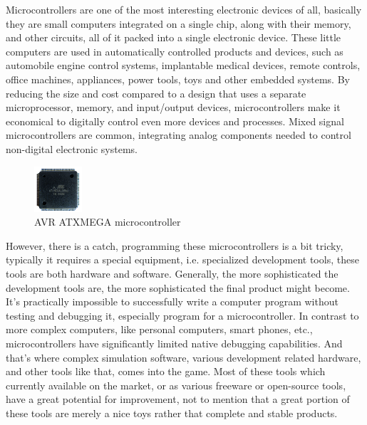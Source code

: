 \documentclass[a4paper,twoside,15pt]{book}
\begin{document}
		Microcontrollers are one of the most interesting electronic devices of all, basically they are small computers integrated on a single chip, along with their memory, and other circuits, all of it packed into a single electronic device. These little computers are used in automatically controlled products and devices, such as automobile engine control systems, implantable medical devices, remote controls, office machines, appliances, power tools, toys and other embedded systems. By reducing the size and cost compared to a design that uses a separate microprocessor, memory, and input/output devices, microcontrollers make it economical to digitally control even more devices and processes. Mixed signal microcontrollers are common, integrating analog components needed to control non-digital electronic systems.

		\begin{figure}
			\centering{}
			\includegraphics[width=50pt]{images/AVR_ATXMEGA_128A1.jpeg}
			\caption{AVR ATXMEGA microcontroller}
		\end{figure}
		However, there is a catch, programming these microcontrollers is a bit tricky, typically it requires a special equipment, i.e. specialized development tools, these tools are both hardware and software. Generally, the more sophisticated the development tools are, the more sophisticated the final product might become. It's practically impossible to successfully write a computer program without testing and debugging it, especially program for a microcontroller. In contrast to more complex computers, like personal computers, smart phones, etc., microcontrollers have significantly limited native debugging capabilities. And that's where complex simulation software, various development related hardware, and other tools like that, comes into the game. Most of these tools which currently available on the market, or as various freeware or open-source tools, have a great potential for improvement, not to mention that a great portion of these tools are merely a nice toys rather that complete and stable products.
\end{document}
